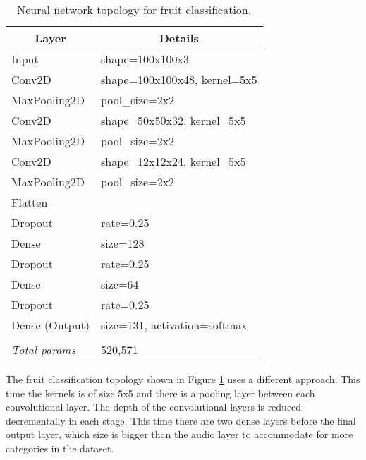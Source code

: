 \begin{table}[thbp]
\centering
\caption{Neural network topology for fruit classification.}
\label{tab:fruit_nn_topo}
\begin{tabular}{|l|l|}
\hline
\multicolumn{1}{|c|}{\textbf{Layer}}          & \multicolumn{1}{|c|}{\textbf{Details}}                     \\ \hline
Input          & shape=100x100x3              \\ \hline
Conv2D         & shape=100x100x48, kernel=5x5 \\ \hline
MaxPooling2D   & pool\_size=2x2               \\ \hline
Conv2D         & shape=50x50x32, kernel=5x5   \\ \hline
MaxPooling2D   & pool\_size=2x2               \\ \hline
Conv2D         & shape=12x12x24, kernel=5x5   \\ \hline
MaxPooling2D   & pool\_size=2x2               \\ \hline
Flatten        &                              \\ \hline
Dropout        & rate=0.25                    \\ \hline
Dense          & size=128                     \\ \hline
Dropout        & rate=0.25                    \\ \hline
Dense          & size=64                      \\ \hline
Dropout        & rate=0.25                    \\ \hline
Dense (Output) & size=131, activation=softmax \\ \hline
               &                              \\ \hline
\textit{Total params}   & 520,571                       \\ \hline
\end{tabular}
\end{table}

The fruit classification topology shown in Figure \ref{tab:fruit_nn_topo} uses a different approach. This time the kernels is of size 5x5 and there is a pooling layer between each convolutional layer. The depth of the convolutional layers is reduced decrementally in each stage. This time there are two dense layers before the final output layer, which size is bigger than the audio layer to accommodate for more categories in the dataset.

